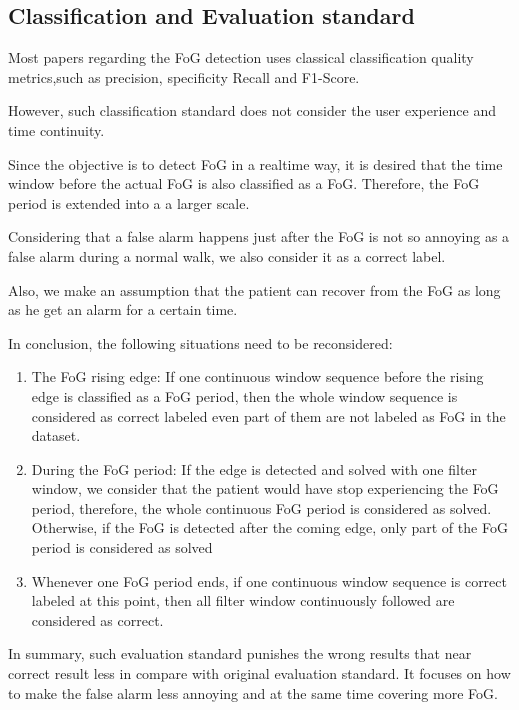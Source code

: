 \documentclass[article]{article}
\begin{document}
\begin{center}
\subsection{Classification and Evaluation standard}
\end{center}


	Most papers regarding the FoG detection uses classical classification quality metrics,such as precision, specificity Recall and F1-Score.
	
	However, such classification standard does not consider the user experience and time continuity.
	
    Since the objective is to detect FoG in a realtime way, it is desired that the time window before the actual FoG is also classified as a FoG. Therefore, the FoG period is extended into a a larger scale.
    
    Considering that a false alarm happens just after  the FoG is not so annoying as a false alarm during a normal walk, we also consider it as a correct label.
    
    Also, we make an assumption that the patient can recover from the FoG as long as he get an alarm for a certain time.
    
    In conclusion, the following situations need to be reconsidered:

    \begin{enumerate}
    	\item The FoG rising edge: If one continuous window sequence before the rising edge is classified as a FoG period, then the whole window sequence is considered as correct labeled even part of them are not labeled as FoG in the dataset.
    	
		\item During the FoG period: If the edge is detected and solved with one filter window, we consider that the patient would have stop experiencing the FoG period, therefore, the whole continuous FoG period is considered as solved.  Otherwise, if the FoG is detected after the coming edge, only part of the FoG period is considered as solved
		
		\item Whenever one FoG period ends, if one continuous window sequence is correct labeled at this point, then all filter window continuously followed are considered as correct.		
    \end{enumerate}

	In summary, such evaluation standard punishes the wrong results that near correct result less in compare with original evaluation standard. It focuses on how to make the false alarm less annoying and at the same time covering more FoG. 
\end{document}
